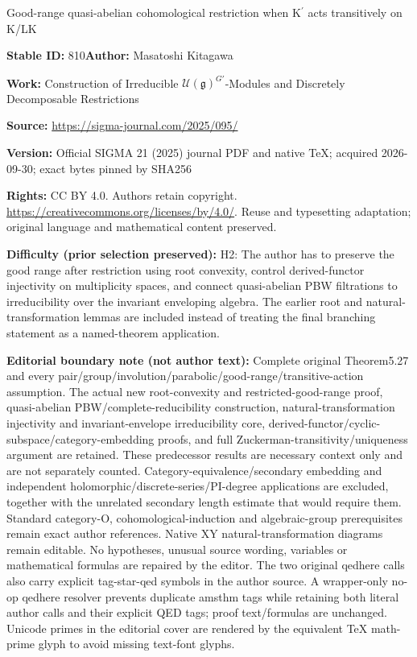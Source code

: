 \documentclass[11pt]{article}
\numberwithin{equation}{section}
\numberwithin{equation}{section}
\theoremstyle{definition}
\begin{document}
\begin{center}\Large Good-range quasi-abelian cohomological restriction when K\ensuremath{{}^{\prime}} acts transitively on K/LK\end{center}
\noindent\textbf{Stable ID:} 810\quad\textbf{Author:} Masatoshi Kitagawa\par
\noindent\textbf{Work:} Construction of Irreducible $\mathcal{U}(\mathfrak{g})^{G'}$-Modules and Discretely Decomposable Restrictions\par
\noindent\textbf{Source:} \url{https://sigma-journal.com/2025/095/}\par
\noindent\textbf{Version:} Official SIGMA 21 (2025) journal PDF and native TeX; acquired 2026-09-30; exact bytes pinned by SHA256\par
\noindent\textbf{Rights:} CC BY 4.0. Authors retain copyright. \url{https://creativecommons.org/licenses/by/4.0/}. Reuse and typesetting adaptation; original language and mathematical content preserved.\par
\noindent\textbf{Difficulty (prior selection preserved):} {\CJKfont H2: The author has to preserve the good range after restriction using root convexity, control derived-functor injectivity on multiplicity spaces, and connect quasi-abelian PBW filtrations to irreducibility over the invariant enveloping algebra. The earlier root and natural-transformation lemmas are included instead of treating the final branching statement as a named-theorem application.}\par
\medskip\noindent\textbf{Editorial boundary note (not author text):} Complete original Theorem5.27 and every pair/group/involution/parabolic/good-range/transitive-action assumption. The actual new root-convexity and restricted-good-range proof, quasi-abelian PBW/complete-reducibility construction, natural-transformation injectivity and invariant-envelope irreducibility core, derived-functor/cyclic-subspace/category-embedding proofs, and full Zuckerman-transitivity/uniqueness argument are retained. These predecessor results are necessary context only and are not separately counted. Category-equivalence/secondary embedding and independent holomorphic/discrete-series/PI-degree applications are excluded, together with the unrelated secondary length estimate that would require them. Standard category-O, cohomological-induction and algebraic-group prerequisites remain exact author references. Native XY natural-transformation diagrams remain editable. No hypotheses, unusual source wording, variables or mathematical formulas are repaired by the editor. The two original qedhere calls also carry explicit tag-star-qed symbols in the author source. A wrapper-only no-op qedhere resolver prevents duplicate amsthm tags while retaining both literal author calls and their explicit QED tags; proof text/formulas are unchanged. Unicode primes in the editorial cover are rendered by the equivalent TeX math-prime glyph to avoid missing text-font glyphs.\par
\end{document}
